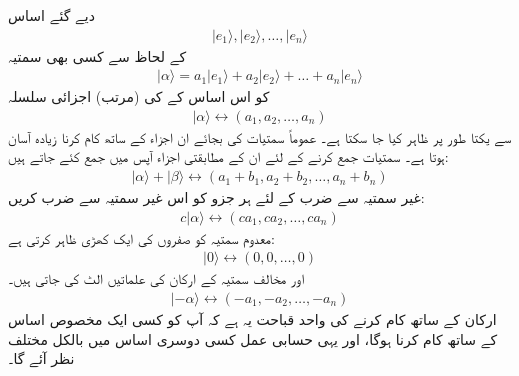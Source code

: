 دیے گئے اساس 
\begin{align}
	|e_1\rangle, |e_2\rangle, \dots, |e_n\rangle
\end{align}
کے لحاظ سے کسی  بھی سمتیہ
\begin{align}
	|\alpha\rangle=a_1|e_1\rangle+a_2|e_2\rangle+\dots+a_n|e_n\rangle
\end{align}
کو اس اساس  کے   کی  (مرتب)   اجزائی سلسلہ 
\begin{align}
	|\alpha\rangle\leftrightarrow(a_1, a_2, \dots, a_n)
\end{align}
سے یکتا طور پر ظاہر کیا جا سکتا ہے۔ عموماً  سمتیات کی بجائے  ان  اجزاء کے ساتھ کام کرنا زیادہ آسان  ہوتا ہے۔  سمتیات  جمع کرنے کے لئے  ان کے مطابقتی اجزاء آپس میں جمع کئے جاتے ہیں:
\begin{align}
	|\alpha\rangle+|\beta\rangle\leftrightarrow(a_1+b_1, a_2+b_2, \dots, a_n+b_n)
\end{align}
غیر سمتیہ سے ضرب  کے لئے ہر جزو کو اس غیر سمتیہ  سے  ضرب کریں:
\begin{align}
	c|\alpha\rangle\leftrightarrow(ca_1, ca_2, \dots, ca_n)
\end{align}
معدوم سمتیہ کو صفروں کی ایک کھڑی ظاہر کرتی ہے:
\begin{align}
	|0\rangle\leftrightarrow(0, 0, \dots, 0)
\end{align}
اور مخالف سمتیہ کے ارکان کی علماتیں  الٹ کی جاتی ہیں۔
\begin{align}
	|-\alpha\rangle\leftrightarrow(-a_1, -a_2, \dots, -a_n)
\end{align}
ارکان کے ساتھ کام کرنے کی واحد  قباحت  یہ ہے کہ  آپ کو کسی ایک مخصوص اساس کے ساتھ کام کرنا ہوگا،  اور یہی  حسابی عمل کسی دوسری  اساس میں بالکل مختلف نظر آئے گا۔

